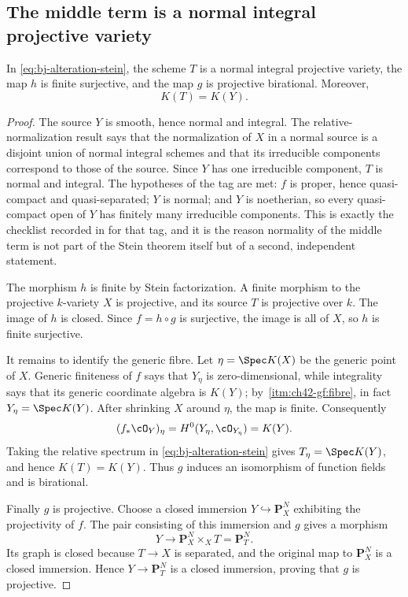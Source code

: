 \subsection{The middle term is a normal integral projective variety}
\label{sec:ch42-middle}

\begin{lemma}\label{lem:bj-alteration-middle}
In \eqref{eq:bj-alteration-stein}, the scheme $T$ is a normal integral
projective variety, the map $h$ is finite surjective, and the map $g$ is
projective birational.
Moreover,
\[
                         K(T)=K(Y).
\tag{42.4}\label{eq:bj-alteration-function-fields}
\]
\end{lemma}

\begin{proof}
The source $Y$ is smooth, hence normal and integral.
The relative-normalization result
\cite[\href{https://stacks.math.columbia.edu/tag/035L}{Tag 035L}]
{stacks-project} says that the normalization of $X$ in a normal source is a
disjoint union of normal integral schemes and that its irreducible components
correspond to those of the source.
Since $Y$ has one irreducible component, $T$ is normal and integral.
The hypotheses of the tag are met: $f$ is proper, hence quasi-compact and
quasi-separated; $Y$ is normal; and $Y$ is noetherian, so every
quasi-compact open of $Y$ has finitely many irreducible components.  This
is exactly the checklist recorded in  for that tag, and it
is the reason normality of the middle term is not part of the Stein theorem
itself but of a second, independent statement.

The morphism $h$ is finite by Stein factorization.
A finite morphism to the projective $k$-variety $X$ is projective, and its
source $T$ is projective over $k$.
The image of $h$ is closed.
Since $f=h\circ g$ is surjective, the image is all of $X$, so $h$ is
finite surjective.

It remains to identify the generic fibre.
Let $\eta=\Spec K(X)$ be the generic point of $X$.
Generic finiteness of $f$ says that $Y_\eta$ is zero-dimensional, while
integrality says that its generic coordinate algebra is $K(Y)$; by
\,\cref{itm:ch42-gf:fibre}, in fact
$Y_\eta=\Spec K(Y)$.
After shrinking $X$ around $\eta$, the map is finite.
Consequently
\[
       (f_*\cO_Y)_\eta=H^0(Y_\eta,\cO_{Y_\eta})=K(Y).
\]
Taking the relative spectrum in \eqref{eq:bj-alteration-stein} gives
$T_\eta=\Spec K(Y)$, and hence $K(T)=K(Y)$.
Thus $g$ induces an isomorphism of function fields and is birational.

Finally $g$ is projective.
Choose a closed immersion $Y\hookrightarrow\mathbf P^N_X$ exhibiting the
projectivity of $f$.
The pair consisting of this immersion and $g$ gives a morphism
\[
              Y\longrightarrow\mathbf P^N_X\times_XT
                       =\mathbf P^N_T.
\]
Its graph is closed because $T\to X$ is separated, and the original map to
$\mathbf P^N_X$ is a closed immersion.
Hence $Y\to\mathbf P^N_T$ is a closed immersion, proving that $g$ is
projective.
\end{proof}

